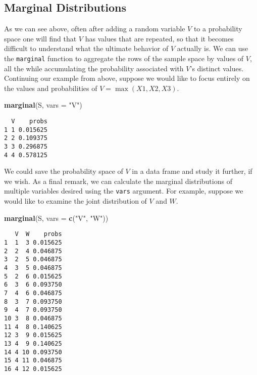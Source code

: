 \documentclass[]{book}
\newenvironment{Shaded}{\begin{snugshade}}{\end{snugshade}}
\newcommand{\KeywordTok}[1]{\textcolor[rgb]{0.13,0.29,0.53}{\textbf{{#1}}}}
\newcommand{\DataTypeTok}[1]{\textcolor[rgb]{0.13,0.29,0.53}{{#1}}}
\newcommand{\StringTok}[1]{\textcolor[rgb]{0.31,0.60,0.02}{{#1}}}
\newcommand{\NormalTok}[1]{{#1}}
\numberwithin{equation}{chapter}
\numberwithin{figure}{chapter}
\theoremstyle{plain}
\theoremstyle{definition}
\theoremstyle{remark}
\theoremstyle{definition}
\theoremstyle{definition}
\theoremstyle{remark}
\begin{document}
\subsection{Marginal Distributions}\label{marginal-distributions}

As we can see above, often after adding a random variable \(V\) to a
probability space one will find that \(V\) has values that are repeated,
so that it becomes difficult to understand what the ultimate behavior of
\(V\) actually is. We can use the \texttt{marginal} function to
aggregate the rows of the sample space by values of \(V\), all the while
accumulating the probability associated with \(V\)'s distinct values.
Continuing our example from above, suppose we would like to focus
entirely on the values and probabilities of \(V=\max(X1,X2,X3)\).

\begin{Shaded}
\begin{Highlighting}[]
\KeywordTok{marginal}\NormalTok{(S, }\DataTypeTok{vars =} \StringTok{"V"}\NormalTok{) }
\end{Highlighting}
\end{Shaded}

\begin{verbatim}
  V    probs
1 1 0.015625
2 2 0.109375
3 3 0.296875
4 4 0.578125
\end{verbatim}

We could save the probability space of \(V\) in a data frame and study
it further, if we wish. As a final remark, we can calculate the marginal
distributions of multiple variables desired using the \texttt{vars}
argument. For example, suppose we would like to examine the joint
distribution of \(V\) and \(W\).

\begin{Shaded}
\begin{Highlighting}[]
\KeywordTok{marginal}\NormalTok{(S, }\DataTypeTok{vars =} \KeywordTok{c}\NormalTok{(}\StringTok{"V"}\NormalTok{, }\StringTok{"W"}\NormalTok{)) }
\end{Highlighting}
\end{Shaded}

\begin{verbatim}
   V  W    probs
1  1  3 0.015625
2  2  4 0.046875
3  2  5 0.046875
4  3  5 0.046875
5  2  6 0.015625
6  3  6 0.093750
7  4  6 0.046875
8  3  7 0.093750
9  4  7 0.093750
10 3  8 0.046875
11 4  8 0.140625
12 3  9 0.015625
13 4  9 0.140625
14 4 10 0.093750
15 4 11 0.046875
16 4 12 0.015625
\end{verbatim}
\end{document}
